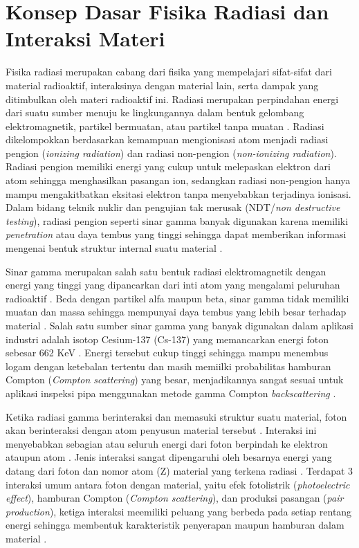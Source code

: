 \documentclass[12pt,a4paper]{report}
\begin{document}
\section{Konsep Dasar Fisika Radiasi dan Interaksi Materi}

Fisika radiasi merupakan cabang dari fisika yang mempelajari sifat-sifat dari material radioaktif, interaksinya dengan material lain, serta dampak yang ditimbulkan oleh materi radioaktif ini. Radiasi merupakan perpindahan energi dari suatu sumber menuju ke lingkungannya dalam bentuk gelombang elektromagnetik, partikel bermuatan, atau partikel tanpa muatan \cite{acevedo2021brief}. 
Radiasi dikelompokkan berdasarkan kemampuan mengionisasi atom menjadi radiasi pengion (\textit{ionizing radiation}) dan radiasi non-pengion (\textit{non-ionizing radiation}). Radiasi pengion memiliki energi yang cukup untuk melepaskan elektron dari atom sehingga menghasilkan pasangan ion, sedangkan radiasi non-pengion hanya mampu mengakitbatkan eksitasi elektron 
tanpa menyebabkan terjadinya ionisasi. Dalam bidang teknik nuklir dan pengujian tak merusak (NDT/\textit{non destructive testing}), radiasi pengion seperti sinar gamma banyak digunakan karena memiliki \textit{penetration} atau daya tembus yang tinggi sehingga dapat memberikan informasi mengenai bentuk struktur internal suatu material \cite{geist2024nondestructive,donner2025comparative}.

Sinar gamma merupakan salah satu bentuk radiasi elektromagnetik dengan energi yang tinggi yang dipancarkan dari inti atom yang mengalami peluruhan radioaktif \cite{geist2024nondestructive}. Beda dengan partikel alfa maupun beta, sinar gamma tidak memiliki muatan dan massa sehingga mempunyai daya tembus yang lebih besar terhadap material \cite{geist2024nondestructive}. Salah satu sumber sinar gamma yang banyak digunakan dalam 
aplikasi industri adalah isotop Cesium-137 (Cs-137) yang memancarkan energi foton sebesar 662 KeV \cite{nguyen2011scattered}. Energi tersebut cukup tinggi sehingga mampu menembus logam dengan ketebalan tertentu dan masih memiilki probabilitas hamburan Compton (\textit{Compton scattering}) yang besar, menjadikannya sangat sesuai untuk aplikasi inspeksi pipa menggunakan metode gamma Compton \textit{backscattering} \cite{kierans2022compton}.

Ketika radiasi gamma berinteraksi dan memasuki struktur suatu material, foton akan berinteraksi dengan atom penyusun material tersebut \cite{geist2024nondestructive}. Interaksi ini menyebabkan sebagian atau seluruh energi dari foton berpindah ke elektron ataupun atom \cite{nguyen2011scattered}. Jenis interaksi sangat dipengaruhi oleh besarnya energi yang datang dari foton dan nomor atom (Z) material yang terkena radiasi \cite{banks2025xray}. Terdapat 3 interaksi umum antara foton 
dengan material, yaitu efek fotolistrik (\textit{photoelectric effect}), hamburan Compton (\textit{Compton scattering}), dan produksi pasangan (\textit{pair production}), ketiga interaksi meemiliki peluang yang berbeda pada setiap rentang energi sehingga membentuk karakteristik penyerapan maupun hamburan dalam material \cite{gazis2026ionizing,banks2025xray}.
\end{document}
